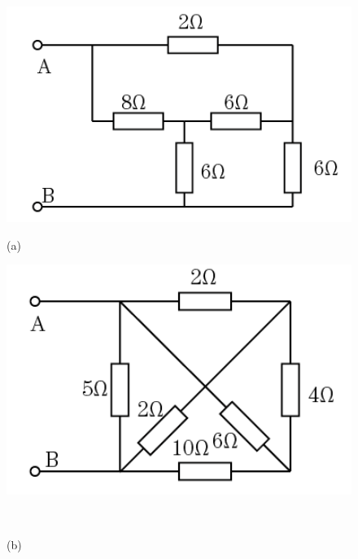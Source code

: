 \documentclass[hyperref, UTF8]{ctexart}
\begin{document}
\begin{figure}[!htb]
  \centering
  \begin{minipage}[t]{0.269\textwidth}
    \centering
    \includegraphics[width=1\textwidth]{p2-20-a.png}
    \caption*{(a)}
  \end{minipage}
  \begin{minipage}[t]{0.256\textwidth}
    \centering
    \includegraphics[width=1\textwidth]{p2-20-b.png}
    \caption*{(b)}
  \end{minipage} \\
  \centering
  \begin{minipage}[t]{0.203\textwidth}
    \centering

\end{minipage}
\end{figure}
\end{document}
